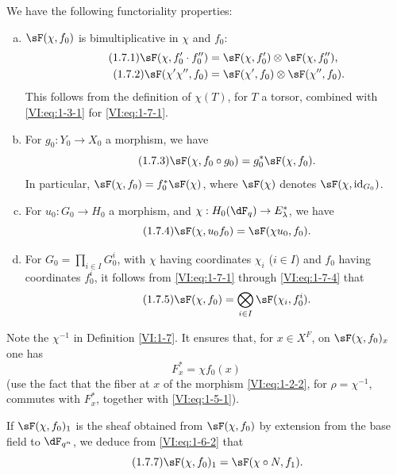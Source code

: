 We have the following functoriality properties:
\begin{enumerate}[a)]
  \item $\sF(\chi,f_0)$ is bimultiplicative in $\chi$ and $f_0$: 
    \begin{align*}\tag{1.7.1}\label{VI:eq:1-7-1}
      \sF(\chi,f_0'\cdot f_0'') &= \sF(\chi,f_0')\otimes \sF(\chi,f_0'') \text{,} \\
      \tag{1.7.2}\label{VI:eq:1-7-2}
      \sF(\chi'\chi'',f_0) &= \sF(\chi',f_0)\otimes \sF(\chi'',f_0) \text{.}
    \end{align*}
This follows from the definition of $\chi(T)$, for $T$ a torsor, combined 
    with \eqref{VI:eq:1-3-1} for \eqref{VI:eq:1-7-1}. 
  \item For $g_0:Y_0\to X_0$ a morphism, we have 
    \begin{equation*}\tag{1.7.3}\label{VI:eq:1-7-3}
      \sF(\chi,f_0\circ g_0) = g_0^\ast \sF(\chi,f_0) \text{.}
    \end{equation*}
    In particular, $\sF(\chi,f_0) = f_0^\ast \sF(\chi)$, where $\sF(\chi)$ 
    denotes $\sF(\chi,\operatorname{id}_{G_0})$. 
  \item For $u_0:G_0\to H_0$ a morphism, and 
    $\chi:H_0(\dF_q) \to E_\lambda^\ast$, we have 
    \begin{equation*}\tag{1.7.4}\label{VI:eq:1-7-4}
      \sF(\chi,u_0 f_0) = \sF(\chi u_0,f_0) \text{.}
    \end{equation*}
  \item For $G_0=\prod_{i\in I} G_0^i$, with $\chi$ having coordinates $\chi_i$ 
    ($i\in I$) and $f_0$ having coordinates $f_0^i$, it follows from 
    \eqref{VI:eq:1-7-1} through \eqref{VI:eq:1-7-4} that 
    \begin{equation*}\tag{1.7.5}\label{VI:eq:1-7-5}
      \sF(\chi,f_0) = \bigotimes_{i\in I} \sF(\chi_i,f_0^i) \text{.}
    \end{equation*}    
\end{enumerate}

Note the $\chi^{-1}$ in Definition \ref{VI:1-7}. It ensures that, for 
$x\in X^F$, on $\sF(\chi,f_0)_x$ one has 
\begin{equation*}\tag{1.7.6}\label{VI:eq:1-7-6}
  F_x^\ast = \chi f_0(x)
\end{equation*}
(use the fact that the fiber at $x$ of the morphism \eqref{VI:eq:1-2-2}, for 
$\rho=\chi^{-1}$, commutes with $F_x^\ast$, together with \eqref{VI:eq:1-5-1}). 

If $\sF(\chi,f_0)_1$ is the sheaf obtained from $\sF(\chi,f_0)$ by extension 
from the base field to $\dF_{q^n}$, we deduce from \eqref{VI:eq:1-6-2} that 
\begin{equation*}\tag{1.7.7}\label{VI:eq:1-7-7}
  \sF(\chi,f_0)_1 = \sF(\chi\circ N,f_1) \text{.}
\end{equation*}






